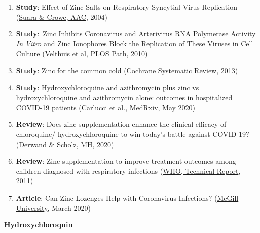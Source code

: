 \begin{enumerate}
\def\labelenumi{\arabic{enumi}.}
\tightlist
\item
  \textbf{Study}: Effect of Zinc Salts on Respiratory Syncytial Virus
  Replication
  (\href{https://www.ncbi.nlm.nih.gov/pmc/articles/PMC353050/}{Suara \&
  Crowe, AAC}, 2004)
\item
  \textbf{Study}:~Zinc Inhibits Coronavirus and Arterivirus RNA
  Polymerase Activity \emph{In Vitro} and Zinc Ionophores Block the
  Replication of These Viruses in Cell Culture
  (\href{https://www.ncbi.nlm.nih.gov/pmc/articles/PMC2973827/}{Velthuis
  et al, PLOS Path}, 2010)
\item
  \textbf{Study}: Zinc for the common cold
  (\href{https://www.cochranelibrary.com/cdsr/doi/10.1002/14651858.CD001364.pub4/full}{Cochrane
  Systematic Review}, 2013)
\item
  \textbf{Study}: Hydroxychloroquine and azithromycin plus zinc vs
  hydroxychloroquine and azithromycin alone: outcomes in hospitalized
  COVID-19 patients
  (\href{https://www.medrxiv.org/content/10.1101/2020.05.02.20080036v1}{Carlucci
  et al., MedRxiv}, May 2020)
\item
  \textbf{Review}: Does zinc supplementation enhance the clinical
  efficacy of chloroquine/ hydroxychloroquine to win today's battle
  against COVID-19?
  (\href{https://www.sciencedirect.com/science/article/pii/S0306987720306435}{Derwand
  \& Scholz, MH}, 2020)
\item
  \textbf{Review}: Zinc supplementation to improve treatment outcomes
  among children diagnosed with respiratory infections
  (\href{https://www.who.int/elena/titles/bbc/zinc_pneumonia_children/en/}{WHO,
  Technical Report}, 2011)
\item
  \textbf{Article}: Can Zinc Lozenges Help with Coronavirus Infections?
  (\href{https://www.mcgill.ca/oss/article/health/can-zinc-lozenges-help-coronavirus-infections}{McGill
  University}, March 2020)
\end{enumerate}

\textbf{Hydroxychloroquin}

